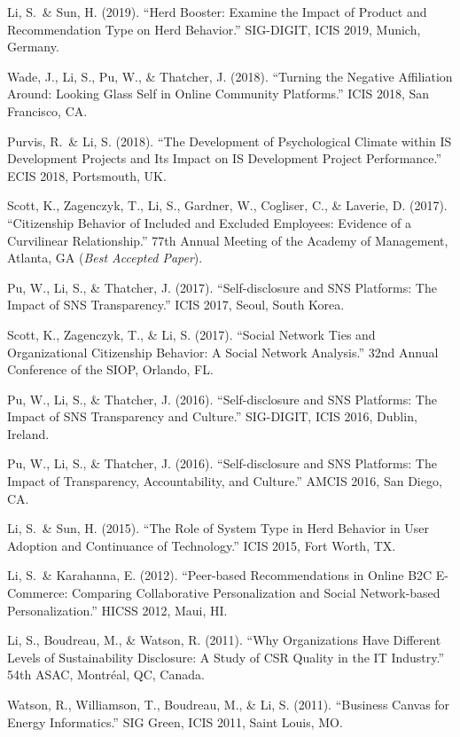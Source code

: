 \documentclass[11pt, letterpaper]{article}
\begin{document}
\begin{publist}
  \item Li, S.\ \& Sun, H. (2019). ``Herd Booster: Examine the Impact of Product and Recommendation Type on Herd Behavior.'' SIG-DIGIT, ICIS 2019, Munich, Germany.

  \item Wade, J., Li, S., Pu, W., \& Thatcher, J. (2018). ``Turning the Negative Affiliation Around: Looking Glass Self in Online Community Platforms.'' ICIS 2018, San Francisco, CA.

  \item Purvis, R.\ \& Li, S. (2018). ``The Development of Psychological Climate within IS Development Projects and Its Impact on IS Development Project Performance.'' ECIS 2018, Portsmouth, UK.

  \item Scott, K., Zagenczyk, T., Li, S., Gardner, W., Cogliser, C., \& Laverie, D. (2017). ``Citizenship Behavior of Included and Excluded Employees: Evidence of a Curvilinear Relationship.'' 77th Annual Meeting of the Academy of Management, Atlanta, GA (\textit{Best Accepted Paper}).

  \item Pu, W., Li, S., \& Thatcher, J. (2017). ``Self-disclosure and SNS Platforms: The Impact of SNS Transparency.'' ICIS 2017, Seoul, South Korea.

  \item Scott, K., Zagenczyk, T., \& Li, S. (2017). ``Social Network Ties and Organizational Citizenship Behavior: A Social Network Analysis.'' 32nd Annual Conference of the SIOP, Orlando, FL.

  \item Pu, W., Li, S., \& Thatcher, J. (2016). ``Self-disclosure and SNS Platforms: The Impact of SNS Transparency and Culture.'' SIG-DIGIT, ICIS 2016, Dublin, Ireland.

  \item Pu, W., Li, S., \& Thatcher, J. (2016). ``Self-disclosure and SNS Platforms: The Impact of Transparency, Accountability, and Culture.'' AMCIS 2016, San Diego, CA.

  \item Li, S.\ \& Sun, H. (2015). ``The Role of System Type in Herd Behavior in User Adoption and Continuance of Technology.'' ICIS 2015, Fort Worth, TX.

  \item Li, S.\ \& Karahanna, E. (2012). ``Peer-based Recommendations in Online B2C E-Commerce: Comparing Collaborative Personalization and Social Network-based Personalization.'' HICSS 2012, Maui, HI.

  \item Li, S., Boudreau, M., \& Watson, R. (2011). ``Why Organizations Have Different Levels of Sustainability Disclosure: A Study of CSR Quality in the IT Industry.'' 54th ASAC, Montr\'{e}al, QC, Canada.

  \item Watson, R., Williamson, T., Boudreau, M., \& Li, S. (2011). ``Business Canvas for Energy Informatics.'' SIG Green, ICIS 2011, Saint Louis, MO.
\end{publist}
\end{document}
